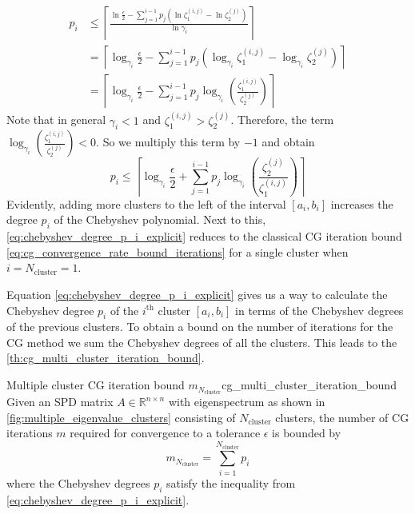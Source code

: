 \begin{align*}
    p_i & \leq \left\lceil\frac{\ln{\frac{\epsilon}{2}} - \sum_{j=1}^{i-1} p_j\left(\ln{\zeta^{(i,j)}_1} - \ln{\zeta^{(j)}_2} \right)}{\ln{\gamma_i}}\right\rceil  \\
        & = \left\lceil\log_{\gamma_i}{\frac{\epsilon}{2}} - \sum_{j=1}^{i-1} p_j\left(\log_{\gamma_i}{\zeta^{(i,j)}_1} - \log_{\gamma_i}{\zeta^{(j)}_2} \right)\right\rceil \\
        & = \left\lceil\log_{\gamma_i}{\frac{\epsilon}{2}} - \sum_{j=1}^{i-1} p_j\log_{\gamma_i}\left(\frac{\zeta^{(i,j)}_1}{\zeta^{(j)}_2}\right)\right\rceil
\end{align*}
Note that in general $\gamma_i < 1$ and $\zeta^{(i,j)}_1 > \zeta^{(j)}_2$. Therefore, the term $\log_{\gamma_i}{\left(\frac{\zeta^{(i,j)}_1}{\zeta^{(j)}_2}\right)} < 0$. So we multiply this term by $-1$ and obtain
\begin{equation}
    p_i \leq \left\lceil\log_{\gamma_i}{\frac{\epsilon}{2}} + \sum_{j=1}^{i-1} p_j\log_{\gamma_i}\left(\frac{\zeta^{(j)}_2}{\zeta^{(i,j)}_1}\right)\right\rceil
    \label{eq:chebyshev_degree_p_i_explicit}
\end{equation}
Evidently, adding more clusters to the left of the interval $[a_i,b_i]$ increases the degree $p_i$ of the Chebyshev polynomial. Next to this, \cref{eq:chebyshev_degree_p_i_explicit} reduces to the classical CG iteration bound \cref{eq:cg_convergence_rate_bound_iterations} for a single cluster when $i = N_{\text{cluster}} = 1$.

Equation \ref{eq:chebyshev_degree_p_i_explicit} gives us a way to calculate the Chebyshev degree $p_i$ of the $i^{\text{th}}$ cluster $[a_i,b_i]$ in terms of the Chebyshev degrees of the previous clusters. To obtain a bound on the number of iterations for the CG method we sum the Chebyshev degrees of all the clusters. This leads to the \cref{th:cg_multi_cluster_iteration_bound}.
\begin{fancyth}{Multiple cluster CG iteration bound $m_{N_{\text{cluster}}}$}{cg_multi_cluster_iteration_bound}
    Given an SPD matrix $A \in \mathbb{R}^{n \times n}$ with eigenspectrum as shown in \cref{fig:multiple_eigenvalue_clusters} consisting of $N_{\text{cluster}}$ clusters, the number of CG iterations $m$ required for convergence to a tolerance $\epsilon$ is bounded by
    \begin{equation}
        m_{N_{\text{cluster}}} = \sum_{i=1}^{N_{\text{cluster}}} p_i
        \label{eq:cg_iteration_bound_multiple_clusters}
    \end{equation}
    where the Chebyshev degrees $p_i$ satisfy the inequality from \cref{eq:chebyshev_degree_p_i_explicit}.
\end{fancyth}

